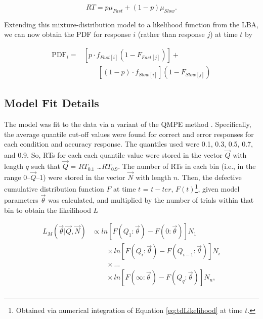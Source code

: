 \documentclass[a4paper, jou, natbib]{apa6}
\begin{document}
\begin{equation}
RT = p\mu_{Fast} + (1 - p)\mu_{Slow}.
\end{equation}

Extending this mixture-distribution model to a likelihood function from the LBA, we can now obtain the PDF for response $i$ (rather than response $j$) at time $t$ by 

\begin{equation}
\begin{aligned}
\mbox{PDF}_{i} = & \left[p \cdot f_{Fast[i]}(1 - F_{Fast[j]})\right] + \\ 
&\qquad \left[(1 - p) \cdot f_{Slow[i]}\right] (1 - F_{Slow[j]})
\end{aligned}
\label{eq:tdLikelihood}
\end{equation}

\subsection{Model Fit Details}
The model was fit to the data via a variant of the QMPE method \citep{Heathcote2002}. Specifically, the average quantile cut-off values were found for correct and error responses for each condition and accuracy response. The quantiles used were 0.1, 0.3, 0.5, 0.7, and 0.9. So, RTs for each each quantile value were stored in the vector $\vec{Q}$ with length $q$ such that $\vec{Q}$ = $RT_{0.1}$ \ldots $RT_{0.9}$. The number of RTs in each bin (i.e., in the range 0--$\vec{Q}$--1) were stored in the vector $\vec{N}$ with length $n$. Then, the defective cumulative distribution function $F$ at time $t$ = $t-ter$, $F(t)$\footnote{Obtained via numerical integration of Equation \ref{eq:tdLikelihood} at time $t$.}, given model parameters $\vec{\theta}$ was calculated, and multiplied by the number of trials within that bin to obtain the likeilihood $L$ 

\begin{equation}
\begin{aligned}
L_{M}\left(\vec{\theta} | \vec{Q}, \vec{N}\right) & \propto ln\left[F\left(Q_{1}:\vec{\theta}\right) - F\left(0:\vec{\theta}\right)\right]N_{1} \\ 
& \qquad \times ln\left[F\left(Q_{i}:\vec{\theta}\right) - F\left(Q_{i - 1}:\vec{\theta}\right)\right]N_{i} \\
& \qquad \times \ldots \\
& \qquad \times ln\left[F\left(\infty:\vec{\theta}\right) - F\left(Q_{q}:\vec{\theta}\right)\right]N_{n}, \\
\end{aligned}
\label{eq:qmp}
\end{equation}
\end{document}
